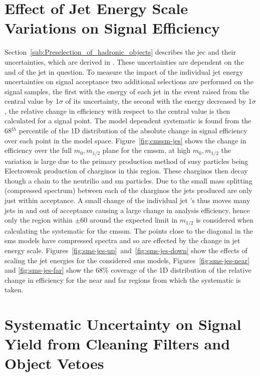 \section{Effect of Jet Energy Scale Variations on Signal Efficiency} 
\label{sub:effects_of_jet_energy_scale_on_signal_efficiency}
Section~\ref{sub:Preselection_of_hadronic_objects} describes the \ac{jec} and 
their uncertainties, which are derived in \cite{Chatrchyan:2011ds}. These 
uncertainties are dependent  on the \mETA and \ET of the jet in question. To 
measure the impact of the individual jet energy uncertainties on signal 
acceptance two additional selections are performed on the signal samples, the 
first with the energy of each jet in the event raised from the central value by 
1$\sigma$ of its uncertainty, the second with the energy decreased by 
1$\sigma$, the relative change in efficiency with respect to the central value 
is then calculated for a signal point. The model dependent  systematic is found 
from the 68$^{th}$ percentile of the 1D distribution of the absolute change in 
signal efficiency over each point in the model space. 
Figure~\ref{fig:cmssm-jes} shows the change in efficiency over the full $m_{0}, 
m_{1/2}$ plane for the \ac{cmssm}, at high $m_{0}, m_{1/2}$ the variation is 
large due to the primary production method of 
\ac{susy} particles being Electroweak production of charginos in this region. 
These charginos then decay though a chain to the neutrilio and \ac{sm} 
particles. Due to the small mass splitting (compressed spectrum) between each of the charginos the jets produced are only just within \ET acceptance. A small 
change of the individual jet \ET's thus moves many jets in and out of 
acceptance causing a large change in analysis efficiency, hence only the region 
within $\pm$\unit{60}{\GeV} around the expected limit in $m_{1/2}$ is 
considered when calculating the systematic for the \ac{cmssm}. The points close 
to the diagonal in the \ac{sms} models have compressed spectra and so are 
effected by the change in jet energy scale. 
Figures~\ref{fig:sms-jes-up}~and~\ref{fig:sms-jes-down} show the effects of 
scaling the jet energies for the considered \ac{sms} models, 
Figures~\ref{fig:sms-jes-near} and \ref{fig:sms-jes-far} show the 68$\%$ 
coverage of the 1D distribution of the relative change in efficiency for the 
near and far regions from which the systematic is taken.

\section{Systematic Uncertainty on Signal Yield from Cleaning Filters and Object Vetoes} %
\label{sub:systematic_uncertainty_on_signal_yield_from_cleaning_filters_and_object_vetoes_}

